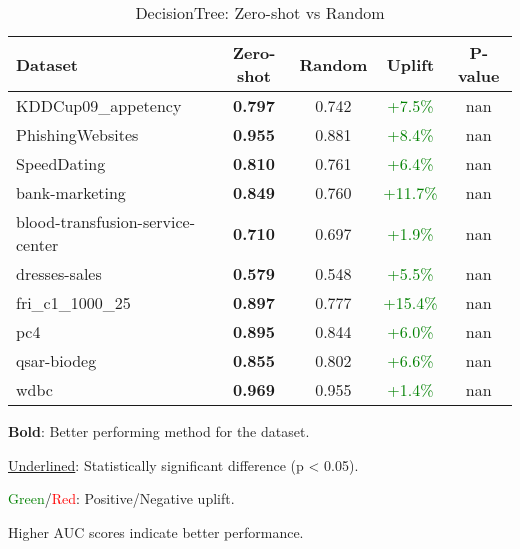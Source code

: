 \begin{table}[htbp]
\centering
\caption{DecisionTree: Zero-shot vs Random}
\label{tab:decisiontree_zeroshot_vs_random}
\begin{tabular}{lcccc}
\toprule
Dataset & Zero-shot & Random & Uplift & P-value \\
\midrule
KDDCup09\_appetency & \textbf{0.797} & 0.742 & \textcolor{green}{+7.5\%} & nan \\
PhishingWebsites & \textbf{0.955} & 0.881 & \textcolor{green}{+8.4\%} & nan \\
SpeedDating & \textbf{0.810} & 0.761 & \textcolor{green}{+6.4\%} & nan \\
bank-marketing & \textbf{0.849} & 0.760 & \textcolor{green}{+11.7\%} & nan \\
blood-transfusion-service-center & \textbf{0.710} & 0.697 & \textcolor{green}{+1.9\%} & nan \\
dresses-sales & \textbf{0.579} & 0.548 & \textcolor{green}{+5.5\%} & nan \\
fri\_c1\_1000\_25 & \textbf{0.897} & 0.777 & \textcolor{green}{+15.4\%} & nan \\
pc4 & \textbf{0.895} & 0.844 & \textcolor{green}{+6.0\%} & nan \\
qsar-biodeg & \textbf{0.855} & 0.802 & \textcolor{green}{+6.6\%} & nan \\
wdbc & \textbf{0.969} & 0.955 & \textcolor{green}{+1.4\%} & nan \\
\bottomrule
\end{tabular}
\begin{tablenotes}
\small
\item \textbf{Bold}: Better performing method for the dataset.
\item \underline{Underlined}: Statistically significant difference (p < 0.05).
\item \textcolor{green}{Green}/\textcolor{red}{Red}: Positive/Negative uplift.
\item Higher AUC scores indicate better performance.
\end{tablenotes}
\end{table}